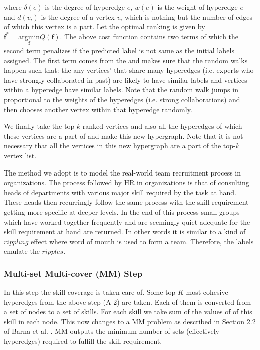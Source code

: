 \documentclass[conference]{IEEEtran}
\begin{document}
where \(\delta(e)\) is the degree of hyperedge \(e\), \(w(e)\) is the weight of hyperedge \(e\) and \(d(v_i)\) is the degree of a vertex \(v_i\) which is nothing but the number of edges of which this vertex is a part. Let the optimal ranking is given by $\mathbf{f}^{*} = \underset{\mathbf{f}} {\mathrm{argmin}} Q(\mathbf{f})$. The above cost function contains two terms of which the second term penalizes if the predicted label is not same as the initial labels assigned. The first term comes from the \cite{Zhou06} and makes sure that the random walks happen such that: the any vertices’ that share many hyperedges (i.e. experts who have strongly collaborated in past) are likely to have similar labels and vertices within a hyperedge have similar labels. Note that the random walk jumps in proportional to the weights of the hyperedges (i.e. strong collaborations) and then chooses another vertex within that hyperedge randomly. 

We finally take the top-$k$ ranked vertices and also all the hyperedges of which these vertices are a part of and make this new hypergraph. Note that it is not necessary that all the vertices in this new hypergraph are a part of the top-$k$ vertex list. 

The method we adopt is to model the real-world team recruitment process in organizations. The process followed by HR in organizations is that of consulting heads of departments with various major skill required by the task at hand. These heads then recurringly follow the same process with the skill requirement getting more specific at deeper levels. In the end of this process small groups which have worked together frequently and are seemingly quiet adequate for the skill requirement at hand are returned. In other words it is similar to a kind of $rippling$ effect where word of mouth is used to form a team. Therefore, the labels emulate the $ripples$.

\subsubsection{Multi-set Multi-cover (MM) Step}

In this step the skill coverage is taken care of. Some top-$K$ most cohesive hyperedges from the above step (A-2) are taken. Each of them is converted from a set of nodes to a set of skills. For each skill we take sum of the values of of this skill in each node. This now changes to a MM problem as described in Section 2.2 of Barna et al. \cite{Barna12}. MM outputs the minimum number of sets (effectively hyperedges) required to fulfill the skill requirement. 
\end{document}
